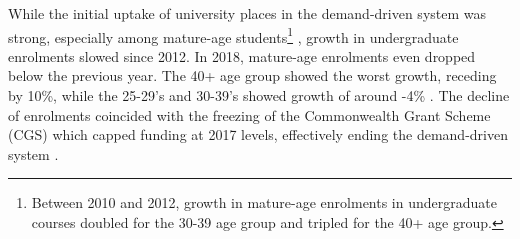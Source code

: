 \documentclass[12pt, a4paper]{article}
\begin{document}
%
While the initial uptake of university places in the demand-driven system was strong, especially among mature-age students\footnote{Between 2010 and 2012, growth in mature-age enrolments in undergraduate courses doubled for the 30-39 age group and tripled for the 40+ age group.} \citep{ua2019}, growth in undergraduate enrolments slowed since 2012. In 2018, mature-age enrolments even dropped below the previous year. The 40+ age group showed the worst growth, receding by 10\%, while the 25-29’s and 30-39’s showed growth of around -4\% \citep{ua2020}. The decline of enrolments coincided with the freezing of the Commonwealth Grant Scheme (CGS) which capped funding at 2017 levels, effectively ending the demand-driven system \citep{ua2020}. 
\end{document}
